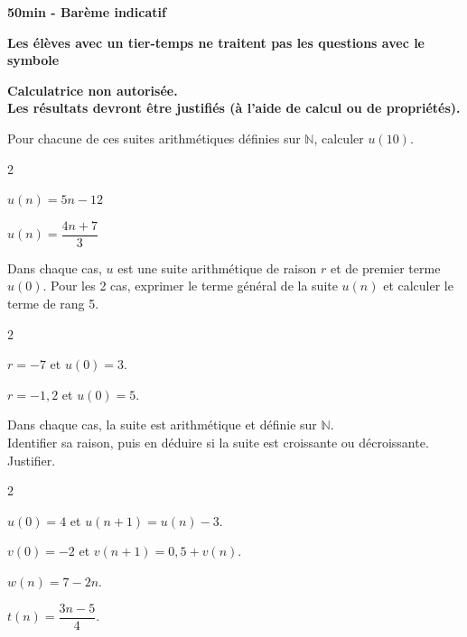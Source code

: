 \documentclass[11pt,a4paper]{article}  %
\begin{document}
	\graphicspath{{images/}}
	
	\begin{center}
	\end{center}

\begin{center}\textbf{50min - Barème indicatif}\end{center}
\begin{center}\textbf{Les élèves avec un tier-temps ne traitent pas les questions avec  le symbole }\end{center}
\begin{center}\textbf{Calculatrice non autorisée.\\Les résultats devront être justifiés (à l'aide de calcul ou de propriétés).}\end{center}


Pour chacune de ces suites arithmétiques définies sur $\mathbb{N}$, calculer $u(10)$.
\begin{multicols}{2}
	\begin{enumMet}
		\item {} $u(n)=5 n-12$
		\item $u(n)=\dfrac{4 n+7}{3}$
	\end{enumMet}
\end{multicols}

Dans chaque cas, $u$ est une suite arithmétique de raison $r$ et de premier terme $u(0)$. Pour les 2 cas, exprimer le terme général de la suite $u(n)$ et calculer le terme de rang 5.
\begin{multicols}{2}
	\begin{enumMet}
		\item $r=-7$ et $u(0)=3$.
		\item {} $r=-1,2$ et $u(0)=5$.
	\end{enumMet}
\end{multicols}


Dans chaque cas, la suite est arithmétique et définie sur $\mathbb{N}$.\\
Identifier sa raison, puis en déduire si la suite est croissante ou décroissante. Justifier.
\begin{multicols}{2}
	\begin{enumMet}
		\item $u(0)=4$ et $u(n+1)=u(n)-3$.
		\item $v(0)=-2$ et $v(n+1)=0,5+v(n)$.
		\item $w(n)=7-2n$.
		\item {} $t(n)=\dfrac{3n-5}{4}$.
	\end{enumMet}
\end{multicols}
\end{document}
